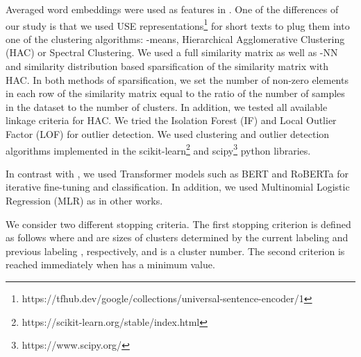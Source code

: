 \documentclass[11pt,a4paper]{article}
\begin{document}
Averaged word embeddings were used as features in \cite{rakib2020enhancement,xu2017self}. One of the differences of our study is that we used USE representations\footnote{https://tfhub.dev/google/collections/universal-sentence-encoder/1} \cite{DBLP:journals/corr/abs-1803-11175,DBLP:journals/corr/abs-1907-04307} for short texts to plug them into one of the clustering algorithms: -means, Hierarchical Agglomerative Clustering (HAC) or Spectral Clustering. We used a full similarity matrix as well as -NN and similarity distribution based sparsification of the similarity matrix  \cite{rakib2018improving} with HAC. In both methods of sparsification, we set the number of non-zero elements in each row of the similarity matrix equal to the ratio of the number of samples in the dataset to the number of clusters. In addition, we tested all available linkage criteria for HAC. We tried the Isolation Forest (IF) \cite{liu2008isolation} and Local Outlier Factor (LOF) \cite{breunig2000lof} for outlier detection. We used clustering and outlier detection algorithms implemented in the scikit-learn\footnote{https://scikit-learn.org/stable/index.html} and scipy\footnote{https://www.scipy.org/} python libraries.

In contrast with \cite{rakib2020enhancement}, we used Transformer models such as BERT \cite{devlin2018bert} and RoBERTa \cite{liu2019roberta} for iterative fine-tuning and classification. In addition, we used Multinomial Logistic Regression (MLR) as in other works.

We consider two different stopping criteria. The first stopping criterion \cite{rakib2020enhancement} is defined as follows  where  and  are sizes of clusters determined by the current labeling  and previous labeling , respectively, and  is a cluster number. The second criterion is reached immediately when  has a minimum value.
\end{document}
